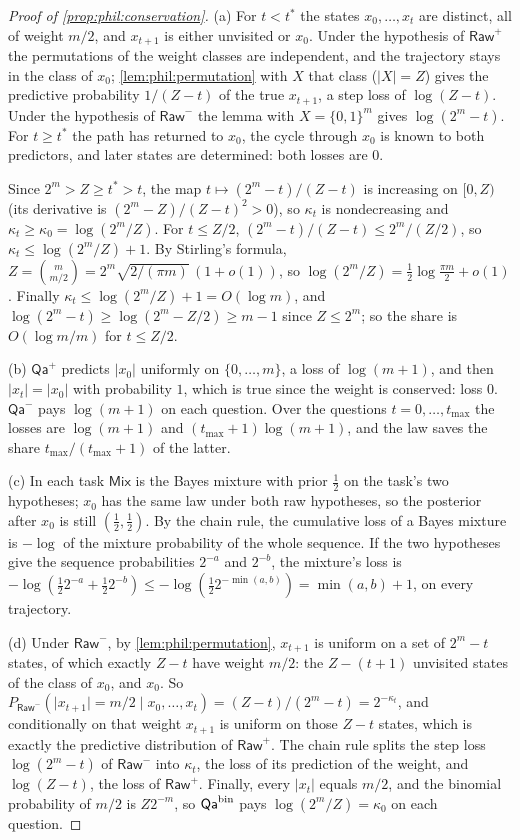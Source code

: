 \begin{proof}[Proof of \cref{prop:phil:conservation}]
(a) For $t<t^*$ the states $x_0,\dots,x_t$ are distinct, all of weight $m/2$, and $x_{t+1}$ is either unvisited or $x_0$. Under the hypothesis of $\mathsf{Raw}^+$ the permutations of the weight classes are independent, and the trajectory stays in the class of $x_0$; \cref{lem:phil:permutation} with $X$ that class ($\lvert X\rvert=Z$) gives the predictive probability $1/(Z-t)$ of the true $x_{t+1}$, a step loss of $\log(Z-t)$. Under the hypothesis of $\mathsf{Raw}^-$ the lemma with $X=\{0,1\}^m$ gives $\log(2^m-t)$. For $t\ge t^*$ the path has returned to $x_0$, the cycle through $x_0$ is known to both predictors, and later states are determined: both losses are $0$.

Since $2^m>Z\ge t^*>t$, the map $t\mapsto(2^m-t)/(Z-t)$ is increasing on $[0,Z)$ (its derivative is $(2^m-Z)/(Z-t)^2>0$), so $\kappa_t$ is nondecreasing and $\kappa_t\ge\kappa_0=\log(2^m/Z)$. For $t\le Z/2$, $(2^m-t)/(Z-t)\le2^m/(Z/2)$, so $\kappa_t\le\log(2^m/Z)+1$. By Stirling's formula, $Z=\binom m{m/2}=2^m\sqrt{2/(\pi m)}\,(1+o(1))$, so $\log(2^m/Z)=\frac12\log\frac{\pi m}2+o(1)$. Finally $\kappa_t\le\log(2^m/Z)+1=O(\log m)$, and $\log(2^m-t)\ge\log(2^m-Z/2)\ge m-1$ since $Z\le2^m$; so the share is $O(\log m/m)$ for $t\le Z/2$.

(b) $\mathsf{Qa}^+$ predicts $\lvert x_0\rvert$ uniformly on $\{0,\dots,m\}$, a loss of $\log(m+1)$, and then $\lvert x_t\rvert=\lvert x_0\rvert$ with probability $1$, which is true since the weight is conserved: loss $0$. $\mathsf{Qa}^-$ pays $\log(m+1)$ on each question. Over the questions $t=0,\dots,t_{\max}$ the losses are $\log(m+1)$ and $(t_{\max}+1)\log(m+1)$, and the law saves the share $t_{\max}/(t_{\max}+1)$ of the latter.

(c) In each task $\mathsf{Mix}$ is the Bayes mixture with prior $\frac12$ on the task's two hypotheses; $x_0$ has the same law under both raw hypotheses, so the posterior after $x_0$ is still $(\frac12,\frac12)$. By the chain rule, the cumulative loss of a Bayes mixture is $-\log$ of the mixture probability of the whole sequence. If the two hypotheses give the sequence probabilities $2^{-a}$ and $2^{-b}$, the mixture's loss is $-\log(\frac122^{-a}+\frac122^{-b})\le-\log(\frac122^{-\min(a,b)})=\min(a,b)+1$, on every trajectory.

(d) Under $\mathsf{Raw}^-$, by \cref{lem:phil:permutation}, $x_{t+1}$ is uniform on a set of $2^m-t$ states, of which exactly $Z-t$ have weight $m/2$: the $Z-(t+1)$ unvisited states of the class of $x_0$, and $x_0$. So $P_{\mathsf{Raw}^-}(\lvert x_{t+1}\rvert=m/2\mid x_0,\dots,x_t)=(Z-t)/(2^m-t)=2^{-\kappa_t}$, and conditionally on that weight $x_{t+1}$ is uniform on those $Z-t$ states, which is exactly the predictive distribution of $\mathsf{Raw}^+$. The chain rule splits the step loss $\log(2^m-t)$ of $\mathsf{Raw}^-$ into $\kappa_t$, the loss of its prediction of the weight, and $\log(Z-t)$, the loss of $\mathsf{Raw}^+$. Finally, every $\lvert x_t\rvert$ equals $m/2$, and the binomial probability of $m/2$ is $Z2^{-m}$, so $\mathsf{Qa}^{\rm bin}$ pays $\log(2^m/Z)=\kappa_0$ on each question.
\end{proof}

